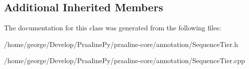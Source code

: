 \subsection*{Additional Inherited Members}


The documentation for this class was generated from the following files\+:\begin{DoxyCompactItemize}
\item 
/home/george/\+Develop/\+Praaline\+Py/praaline-\/core/annotation/Sequence\+Tier.\+h\item 
/home/george/\+Develop/\+Praaline\+Py/praaline-\/core/annotation/Sequence\+Tier.\+cpp\end{DoxyCompactItemize}
